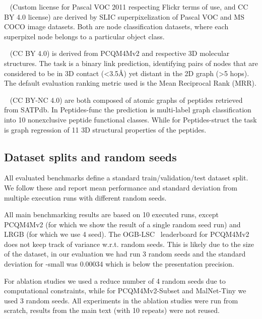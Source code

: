 \documentclass{article}
\begin{document}
~\cite{dwivedi2022LRGB} (Custom license for Pascal VOC 2011 respecting Flickr terms of use, and CC BY 4.0 license)
are derived by SLIC superpixelization of Pascal VOC and MS COCO image datasets. Both are node classification datasets, where each superpixel node belongs to a particular object class.

~\cite{dwivedi2022LRGB} (CC BY 4.0) is derived from PCQM4Mv2 and respective 3D molecular structures. The task is a binary link prediction, identifying pairs of nodes that are considered to be in 3D contact (<3.5{\AA}) yet distant in the 2D graph (>5 hops). The default evaluation ranking metric used is the Mean Reciprocal Rank (MRR).

~\cite{dwivedi2022LRGB} (CC BY-NC 4.0)
are both composed of atomic graphs of peptides retrieved from SATPdb. In Peptides-func the prediction is multi-label graph classification into 10 nonexclusive peptide functional classes. While for Peptides-struct the task is graph regression of 11 3D structural properties of the peptides.


\subsection{Dataset splits and random seeds}\label{app:splits}
All evaluated benchmarks define a standard train/validation/test dataset split. We follow these and report mean performance and standard deviation from multiple execution runs with different random seeds.

All main benchmarking results are based on 10 executed runs, except PCQM4Mv2 (for which we show the result of a single random seed run) and LRGB (for which we use 4 seed).
The OGB-LSC~\cite{hu2021ogblsc} leaderboard for PCQM4Mv2 does not keep track of variance w.r.t. random seeds. This is likely due to the size of the dataset, in our evaluation we had run 3 random seeds and the standard deviation for \method-small was 0.00034 which is below the presentation precision.

For ablation studies we used a reduce number of 4 random seeds due to computational constraints, while for PCQM4Mv2-Subset and MalNet-Tiny we used 3 random seeds. All experiments in the ablation studies were run from scratch, results from the main text (with 10 repeats) were not reused.
\end{document}
